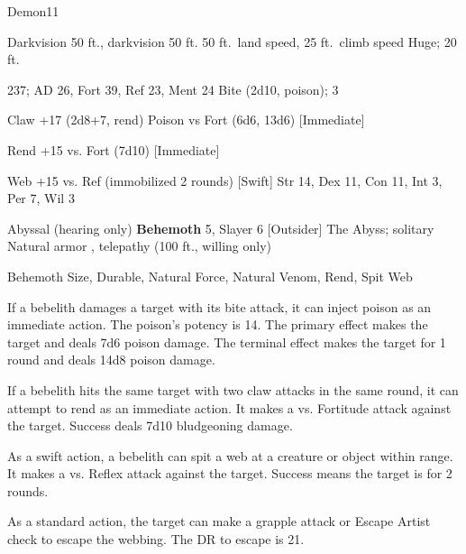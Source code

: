     \begin{monsection}[Bebelith]{Demon}{11}
        \begin{spellcontent}
            \begin{spelltargetinginfo}
                \pari {} Darkvision 50 ft., darkvision 50 ft.
                \pari {} 50 ft.\ land speed, 25 ft.\ climb speed
                \pari {} Huge;  20 ft.
            \end{spelltargetinginfo}
            \begin{spelleffects}
                \pari {} 237;  AD 26, Fort 39, Ref 23, Ment 24
                \pari {} Bite  (2d10, poison);  3
                \par Claw +17 (2d8+7, rend)
                \pari {} Poison  vs Fort (6d6, 13d6) [Immediate]
                \par Rend +15 vs. Fort (7d10) [Immediate]
                \par Web +15 vs. Ref (immobilized 2 rounds) [Swift]
                \pari {} Str 14, Dex 11, Con 11, Int 3, Per 7, Wil 3
            \end{spelleffects}
        \end{spellcontent}
        \begin{spellfooter}
            \pari {} Abyssal (hearing only)
            \pari {} \textbf{Behemoth} 5, Slayer 6 [Outsider]
            \pari {} The Abyss; solitary
            \pari {} Natural armor , telepathy (100 ft., willing only)
        \end{spellfooter}
    \end{monsection}
     Behemoth Size, Durable, Natural Force, Natural Venom, Rend, Spit Web

     If a bebelith damages a target with its bite attack, it can inject poison as an immediate action.
    The poison's potency is 14.
    The primary effect makes the target \sickened and deals 7d6 poison damage.
    The terminal effect makes the target \nauseated for 1 round and deals 14d8 poison damage.

     If a bebelith hits the same target with two claw attacks in the same round, it can attempt to rend as an immediate action.
    It makes a  vs. Fortitude attack against the target.
    Success deals 7d10 bludgeoning damage.

     As a swift action, a bebelith can spit a web at a creature or object within \rngmed range.
    It makes a  vs. Reflex attack against the target.
    Success means the target is \immobilized for 2 rounds.

    As a standard action, the target can make a grapple attack or Escape Artist check to escape the webbing.
    The DR to escape is 21.
